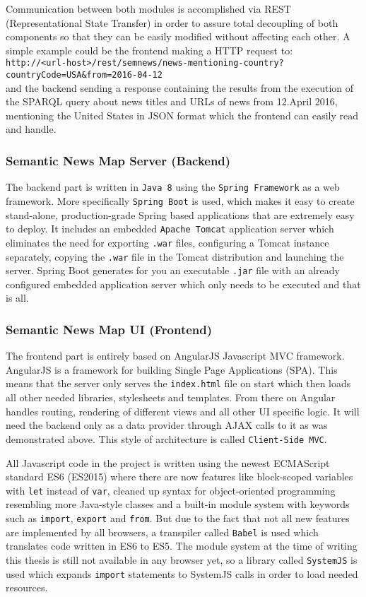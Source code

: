 Communication between both modules is accomplished via REST (Representational State Transfer) in order to assure total decoupling of both components so that they can be easily modified without affecting each other. A simple example could be the frontend making a HTTP request to:\\
\texttt{http://<url-host>/rest/semnews/news-mentioning-country?\\countryCode=USA\&from=2016-04-12}\\ and the backend sending a response containing the results from the execution of the SPARQL query about news titles and URLs of news from 12.April 2016, mentioning the United States in JSON format which the frontend can easily read and handle. 

\subsubsection{Semantic News Map Server (Backend)}
The backend part is written in \texttt{Java 8} using the \texttt{Spring Framework} as a web framework. More specifically \texttt{Spring Boot} is used, which makes it easy to create stand-alone, production-grade Spring based applications that are extremely easy to deploy. It includes an embedded \texttt{Apache Tomcat} application server which eliminates the need for exporting \texttt{.war} files, configuring a Tomcat instance separately, copying the \texttt{.war} file in the Tomcat distribution and launching the server. Spring Boot generates for you an executable \texttt{.jar} file with an already configured embedded application server which only needs to be executed and that is all.

\subsubsection{Semantic News Map UI (Frontend)}
The frontend part is entirely based on AngularJS Javascript MVC framework. AngularJS is a framework for building Single Page Applications (SPA). This means that the server only serves the \texttt{index.html} file on start which then loads all other needed libraries, stylesheets and templates. From there on Angular handles routing, rendering of different views and all other UI specific logic. It will need the backend only as a data provider through AJAX calls to it as was demonstrated above. This style of architecture is called \texttt{Client-Side MVC}.

All Javascript code in the project is written using the newest ECMAScript standard ES6 (ES2015) where there are now features like block-scoped variables with \texttt{let} instead of \texttt{var}, cleaned up syntax for object-oriented programming resembling more Java-style classes and a built-in module system with keywords such as \texttt{import}, \texttt{export} and \texttt{from}. But due to the fact that not all new features are implemented by all browsers, a transpiler called \texttt{Babel} is used which translates code written in ES6 to ES5. The module system at the time of writing this thesis is still not available in any browser yet, so a library called \texttt{SystemJS} is used which expands \texttt{import} statements to SystemJS calls in order to load needed resources.

